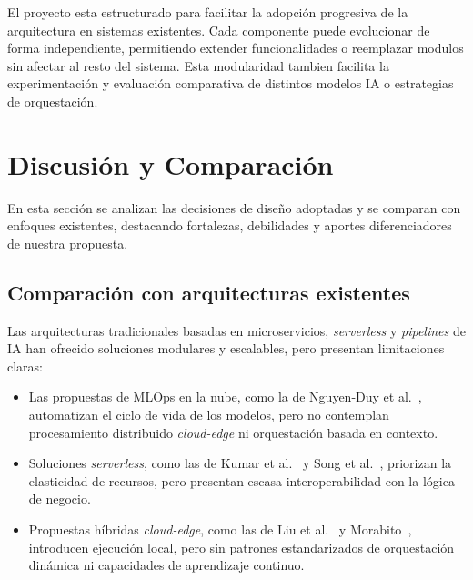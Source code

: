 \documentclass[a4paper]{llncs}
\begin{document}
El proyecto esta estructurado para facilitar la adopción progresiva de la arquitectura en sistemas existentes. Cada componente puede evolucionar de forma independiente, permitiendo extender funcionalidades o reemplazar modulos sin afectar al resto del sistema. Esta modularidad tambien facilita la experimentación y evaluación comparativa de distintos modelos IA o estrategias de orquestación.







\section{Discusión y Comparación}

En esta sección se analizan las decisiones de diseño adoptadas y se comparan con enfoques existentes, destacando fortalezas, debilidades y aportes diferenciadores de nuestra propuesta.

\subsection{Comparación con arquitecturas existentes}

Las arquitecturas tradicionales basadas en microservicios, \textit{serverless} y \textit{pipelines} de IA han ofrecido soluciones modulares y escalables, pero presentan limitaciones claras:

\begin{itemize}
    \item Las propuestas de MLOps en la nube, como la de Nguyen-Duy et al.~\cite{nguyenduy2022mlops}, automatizan el ciclo de vida de los modelos, pero no contemplan procesamiento distribuido \textit{cloud-edge} ni orquestación basada en contexto.
    
    \item Soluciones \textit{serverless}, como las de Kumar et al.~\cite{kumar2024serverlessai} y Song et al.~\cite{song2023surveyserverless}, priorizan la elasticidad de recursos, pero presentan escasa interoperabilidad con la lógica de negocio.
    
    \item Propuestas híbridas \textit{cloud-edge}, como las de Liu et al.~\cite{liu2022edgecloud} y Morabito~\cite{morabito2018foggy}, introducen ejecución local, pero sin patrones estandarizados de orquestación dinámica ni capacidades de aprendizaje continuo.
\end{itemize}
\end{document}
